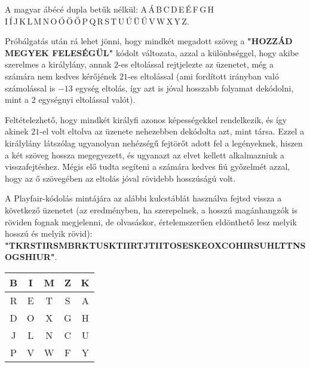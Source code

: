\begin{solution}
A magyar ábécé dupla betűk nélkül: A\,Á\,B\,C\,D\,E\,É\,F\,G\,H\,\\
 I\,Í\,J\,K\,L\,M\,N\,O\,Ó\,Ö\,Ő\,P\,Q\,R\,S\,T\,U\,Ú\,Ü\,Ű\,V\,W\,X\,Y\,Z.

Próbálgatás után rá lehet jönni, hogy mindkét megadott szöveg a \textbf{"HOZZÁD
MEGYEK FELESÉGÜL"} kódolt változata, azzal a különbséggel, hogy akibe
szerelmes a királylány, annak $2$-es eltolással rejtjelezte az üzenetet,
még a számára nem kedves kérőjének $21$-es eltolással (ami fordított
irányban való számolással is $-13$ egység eltolás, így azt is jóval
hosszabb folyamat dekódolni, mint a $2$ egységnyi eltolással valót).

Feltételezhető, hogy mindkét királyfi azonos képességekkel rendelkezik,
és így akinek $21$-el volt eltolva az üzenete nehezebben dekódolta
azt, mint társa. Ezzel a királylány látszólag ugyanolyan nehézségű
fejtörőt adott fel a legényeknek, hiszen a két szöveg hossza megegyezett,
és ugyanazt az elvet kellett alkalmazniuk a visszafejtéshez. Mégis
elő tudta segíteni a számára kedves fiú győzelmét azzal, hogy az ő
szövegében az eltolás jóval rövidebb hosszúságú volt.
\end{solution}
\begin{extraproblem}
A Playfair-kódolás mintájára az alábbi kulcstáblát használva fejtsd
vissza a következő üzenetet (az eredményben, ha szerepelnek, a hosszú
magánhangzók is röviden fognak megjelenni, de olvasáskor, értelemszerűen
eldönthető lesz melyik hosszú és melyik rövid): \textbf{"TKRSTIRSMBRKTUSKTIIRTJTIITOSESKEOXCOHIRSUHLTTNSOGSHIUR"}. 
\begin{center}
\begin{tabular}{|c|c|c|c|c|}
\hline 
B & I & M & Z & K\tabularnewline
\hline 
R & E & T & S & A\tabularnewline
\hline 
D & O & X & G & H\tabularnewline
\hline 
J & L & N & C & U\tabularnewline
\hline 
P & V & W & F & Y\tabularnewline
\hline 
\end{tabular}
\par\end{center}
\end{extraproblem}


